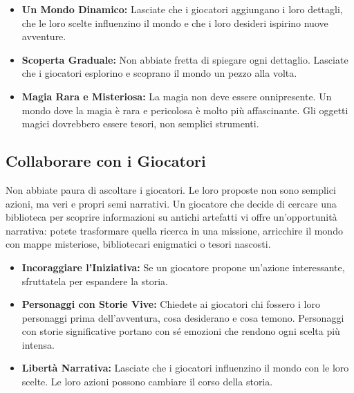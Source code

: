 \documentclass[../manuale_main.tex]{subfiles}
\begin{document}
\begin{itemize}
    \item \textbf{Un Mondo Dinamico:} Lasciate che i giocatori aggiungano i loro dettagli, che le loro scelte influenzino il mondo e che i loro desideri ispirino nuove avventure.
    
    \item \textbf{Scoperta Graduale:} Non abbiate fretta di spiegare ogni dettaglio. Lasciate che i giocatori esplorino e scoprano il mondo un pezzo alla volta.
    
    \item \textbf{Magia Rara e Misteriosa:} La magia non deve essere onnipresente. Un mondo dove la magia è rara e pericolosa è molto più affascinante. Gli oggetti magici dovrebbero essere tesori, non semplici strumenti.
\end{itemize}

\vspace{0.3cm}

\subsection{Collaborare con i Giocatori}
Non abbiate paura di ascoltare i giocatori. Le loro proposte non sono semplici azioni, ma veri e propri semi narrativi. Un giocatore che decide di cercare una biblioteca per scoprire informazioni su antichi artefatti vi offre un'opportunità narrativa: potete trasformare quella ricerca in una missione, arricchire il mondo con mappe misteriose, bibliotecari enigmatici o tesori nascosti.

\begin{itemize}
    \item \textbf{Incoraggiare l'Iniziativa:} Se un giocatore propone un'azione interessante, sfruttatela per espandere la storia.
    
    \item \textbf{Personaggi con Storie Vive:} Chiedete ai giocatori chi fossero i loro personaggi prima dell’avventura, cosa desiderano e cosa temono. Personaggi con storie significative portano con sé emozioni che rendono ogni scelta più intensa.
    
    \item \textbf{Libertà Narrativa:} Lasciate che i giocatori influenzino il mondo con le loro scelte. Le loro azioni possono cambiare il corso della storia.
\end{itemize}

\vspace{0.3cm}
\end{document}
